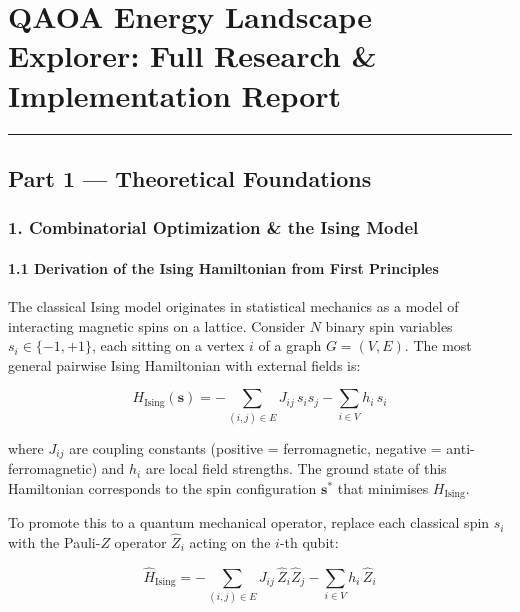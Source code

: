 \documentclass[
  11pt,
]{report}
\author{}
\date{}
\begin{document}
\chapter{QAOA Energy Landscape Explorer: Full Research \& Implementation
Report}\label{qaoa-energy-landscape-explorer-full-research-implementation-report}

\begin{center}\rule{0.5\linewidth}{0.5pt}\end{center}

\section{Part 1 --- Theoretical
Foundations}\label{part-1-theoretical-foundations}

\subsection{1. Combinatorial Optimization \& the Ising
Model}\label{combinatorial-optimization-the-ising-model}

\subsubsection{1.1 Derivation of the Ising Hamiltonian from First
Principles}\label{derivation-of-the-ising-hamiltonian-from-first-principles}

The classical Ising model originates in statistical mechanics as a model
of interacting magnetic spins on a lattice. Consider \(N\) binary spin
variables \(s_i \in \{-1, +1\}\), each sitting on a vertex \(i\) of a
graph \(G = (V, E)\). The most general pairwise Ising Hamiltonian with
external fields is:

\[H_{\text{Ising}}(\mathbf{s}) = -\sum_{(i,j) \in E} J_{ij}\, s_i s_j - \sum_{i \in V} h_i\, s_i\]

where \(J_{ij}\) are coupling constants (positive = ferromagnetic,
negative = anti-ferromagnetic) and \(h_i\) are local field strengths.
The ground state of this Hamiltonian corresponds to the spin
configuration \(\mathbf{s}^*\) that minimises \(H_{\text{Ising}}\).

To promote this to a quantum mechanical operator, replace each classical
spin \(s_i\) with the Pauli-\(Z\) operator \(\hat{Z}_i\) acting on the
\(i\)-th qubit:

\[\hat{H}_{\text{Ising}} = -\sum_{(i,j) \in E} J_{ij}\, \hat{Z}_i \hat{Z}_j - \sum_{i \in V} h_i\, \hat{Z}_i\]
\end{document}
